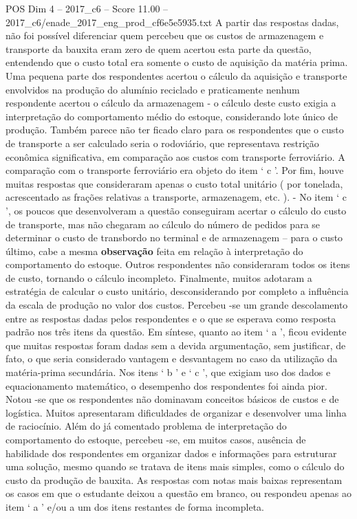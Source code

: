 \begin{textsample}{POS Dim 4 – 2017\_c6 – Score 11.00 – 2017\_c6/enade\_2017\_eng\_prod\_cf6e5e5935.txt}
A partir das respostas dadas, não foi possível diferenciar quem percebeu que os custos de armazenagem e transporte da bauxita eram zero de quem acertou esta parte da questão, entendendo que o custo total era somente o custo de aquisição da matéria prima.
Uma pequena parte dos respondentes acertou o cálculo da aquisição e transporte envolvidos na produção do alumínio reciclado e praticamente nenhum respondente acertou o cálculo da armazenagem - o cálculo deste custo exigia a interpretação do comportamento médio do estoque, considerando lote único de produção.
Também parece não ter ficado claro para os respondentes que o custo de transporte a ser calculado seria o rodoviário, que representava restrição econômica significativa, em comparação aos custos com transporte ferroviário.
A comparação com o transporte ferroviário era objeto do item ‘ c ’.
Por fim, houve muitas respostas que consideraram apenas o custo total unitário ( por tonelada, acrescentado as frações relativas a transporte, armazenagem, etc. ). - No item ‘ c ’, os poucos que desenvolveram a questão conseguiram acertar o cálculo do custo de transporte, mas não chegaram ao cálculo do número de pedidos para se determinar o custo de transbordo no terminal e de armazenagem – para o custo último, cabe a mesma \textbf{observação} feita em relação à interpretação do comportamento do estoque.
Outros respondentes não consideraram todos os itens de custo, tornando o cálculo incompleto.
Finalmente, muitos adotaram a estratégia de calcular o custo unitário, desconsiderando por completo a influência da escala de produção no valor dos custos.
Percebeu -se um grande descolamento entre as respostas dadas pelos respondentes e o que se esperava como resposta padrão nos três itens da questão.
Em síntese, quanto ao item ‘ a ’, ficou evidente que muitas respostas foram dadas sem a devida argumentação, sem justificar, de fato, o que seria considerado vantagem e desvantagem no caso da utilização da matéria-prima secundária.
Nos itens ‘ b ’ e ‘ c ’, que exigiam uso dos dados e equacionamento matemático, o desempenho dos respondentes foi ainda pior.
Notou -se que os respondentes não dominavam conceitos básicos de custos e de logística.
Muitos apresentaram dificuldades de organizar e desenvolver uma linha de raciocínio.
Além do já comentado problema de interpretação do comportamento do estoque, percebeu -se, em muitos casos, ausência de habilidade dos respondentes em organizar dados e informações para estruturar uma solução, mesmo quando se tratava de itens mais simples, como o cálculo do custo da produção de bauxita.
As respostas com notas mais baixas representam os casos em que o estudante deixou a questão em branco, ou respondeu apenas ao item ‘ a ’ e/ou a um dos itens restantes de forma incompleta.

\end{textsample}
